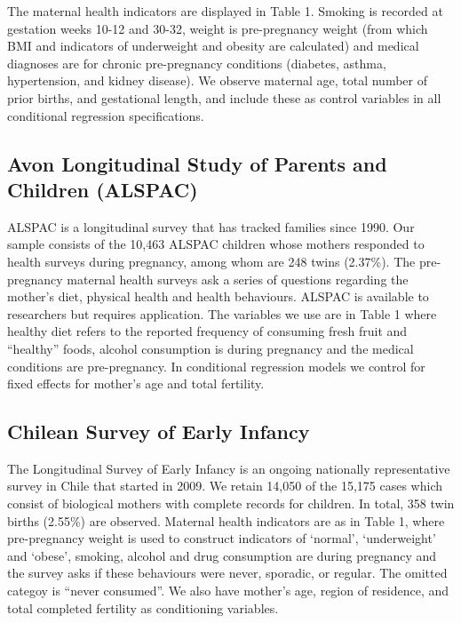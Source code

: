 \documentclass{nature}
\begin{document}
\begin{linenumbers}
The maternal health indicators are displayed in Table 1. Smoking is recorded at gestation weeks 10-12 and 30-32, weight is pre-pregnancy weight (from which BMI and indicators of underweight and obesity are calculated) and medical diagnoses are for chronic pre-pregnancy conditions (diabetes, asthma, hypertension, and kidney disease). We observe maternal age, total number of prior births, and gestational length, and include these as control variables in all conditional regression specifications.

\subsection{Avon Longitudinal Study of Parents and Children (ALSPAC)}
ALSPAC is a longitudinal survey that has tracked families since 1990. Our sample consists of the 10,463 ALSPAC children whose mothers responded to health surveys during pregnancy, among whom are 248 twins (2.37\%). The pre-pregnancy maternal health surveys ask a series of questions regarding the mother's diet, physical health and health behaviours. ALSPAC is available to researchers but requires application. The variables we use are in Table 1 where healthy diet refers to the reported frequency of consuming fresh fruit and ``healthy'' foods, alcohol consumption is during pregnancy and the medical conditions are pre-pregnancy. In conditional regression models we control for fixed effects for mother's age and total fertility.

\subsection{Chilean Survey of Early Infancy}

The Longitudinal Survey of Early Infancy is an ongoing nationally representative survey in Chile that started in 2009.  We retain 14,050 of the 15,175 cases which consist of biological mothers with complete records for children. In total, 358 twin births (2.55\%) are observed. Maternal health indicators are as in Table 1, where pre-pregnancy weight is used to construct indicators of  `normal', `underweight' and `obese', smoking, alcohol and drug consumption are during pregnancy and the survey asks if these behaviours were never, sporadic, or regular. The omitted categoy is ``never consumed''. We also have mother's age, region of residence, and total completed fertility as conditioning variables. 


\end{linenumbers}
\end{document}
